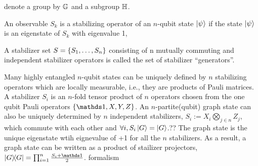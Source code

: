 denote a group by $\mathbb{G}$ and a subgroup $\mathbb{H}$. 
\begin{definition}
\end{definition}
\begin{definition}\label{def:clifford}
\end{definition}
\begin{definition}[Stabilizer]\label{def:stabilizer}
	An observable $S_k$ is a stabilizing operator of an $n$-qubit state $\ket{\psi}$ if the state $\ket{\psi}$ is an eigenstate of $S_k$ with eigenvalue 1,

	A stabilizer set $S = \qty{ S_1, \dots , S_n}$ consisting of n mutually commuting and independent stabilizer operators is called the set of stabilizer “generators”.
\end{definition}
Many highly entangled $n$-qubit states can be uniquely defined by $n$ stabilizing operators which are locally measurable, i.e., they are products of Pauli matrices.
A stabilizer $S_i$ is an $n$-fold tensor product of $n$ operators chosen from the one qubit Pauli operators $\qty{\identity,X,Y,Z}$.
	An $n$-partite(qubit) graph state can also be uniquely determined by $n$ independent stabilizers, 
	$S_i:= X_i \bigotimes_{j\in n}Z_j$, 
	which commute with each other and $\forall i,S_i\ket{G}=\ket{G}$.??
	The graph state is the unique eigenstate wtih eignevalue of +1 for all the $n$ stabilizers.
	As a result, a graph state can be written as a product of stailizer projectors, $\op{G}=\prod_{i=1}^n \frac{S_i +\identity}{2}$.
	 formalism
